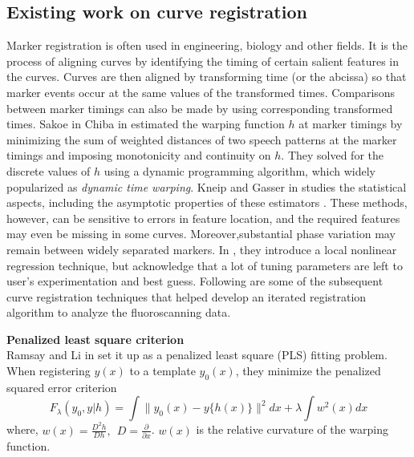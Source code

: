 \subsection{Existing work on curve registration}
Marker registration is often used in engineering, biology and other fields. It is the process of aligning curves by identifying the timing of certain salient features in the curves. Curves are then aligned by transforming time (or the abcissa) so that marker events occur at the same values of the transformed times. Comparisons between marker timings can also be made by using corresponding transformed times. Sakoe in Chiba in \cite{Sakoe_Chiba_1978_IEEE} estimated the warping function $h$ at marker timings by minimizing the sum of weighted distances of two speech patterns at the marker timings and imposing monotonicity and continuity on $h$. They solved for the discrete values of $h$ using a dynamic programming algorithm, which widely popularized as {\emph{dynamic time warping}}. Kneip and Gasser in \cite{Kneip_Gasser_1992_AnnStat} studies the statistical aspects, including the asymptotic properties of these estimators \cite{Kneip_etal_2000_CJS}. These methods, however, can be sensitive to errors in feature location, and the  required features may even be missing in some curves. Moreover,substantial phase variation may remain between widely separated markers. In \cite{Kneip_etal_2000_CJS}, they introduce a local nonlinear regression technique, but acknowledge that a lot of tuning parameters are left to user's experimentation and best guess. Following are some of the subsequent curve registration techniques that helped develop an iterated registration algorithm to analyze the fluoroscanning data. 

\noindent
{\bf{Penalized least square criterion}} \\
Ramsay and Li in \cite{Ramsay_Li_1998_JRSSB} set it up as a penalized least square (PLS) fitting problem. When registering $y(x)$ to a template $y_0(x)$, they minimize the penalized squared error criterion
\[ F_{\lambda}(y_0, y|h) = \displaystyle \int \| y_0(x) - y\{h(x)\} \|^2 dx + \lambda \displaystyle \int w^2(x)dx\]
where, $w(x) = \frac{D^2h}{Dh},\ \ D = \frac{\partial}{\partial x}$. $w(x)$ is the relative curvature of the warping function.

